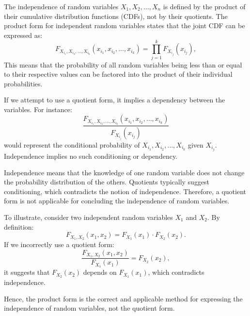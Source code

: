 \begin{solution}
    The independence of random variables \( X_1, X_2, \ldots, X_n \) is defined by the product of their cumulative distribution functions (CDFs), not by their quotients. The product form for independent random variables states that the joint CDF can be expressed as:
    \[
    F_{X_{i_1}, X_{i_2}, \ldots, X_{i_k}}(x_{i_1}, x_{i_2}, \ldots, x_{i_k}) = \prod_{j=1}^k F_{X_{i_j}}(x_{i_j}),
    \]
    This means that the probability of all random variables being less than or equal to their respective values can be factored into the product of their individual probabilities.

    If we attempt to use a quotient form, it implies a dependency between the variables. For instance:
    \[
    \frac{F_{X_{i_1}, X_{i_2}, \ldots, X_{i_k}}(x_{i_1}, x_{i_2}, \ldots, x_{i_k})}{F_{X_{i_j}}(x_{i_j})}
    \]
    would represent the conditional probability of \( X_{i_1}, X_{i_2}, \ldots, X_{i_k} \) given \( X_{i_j} \). Independence implies no such conditioning or dependency.

    Independence means that the knowledge of one random variable does not change the probability distribution of the others. Quotients typically suggest conditioning, which contradicts the notion of independence. Therefore, a quotient form is not applicable for concluding the independence of random variables.

    To illustrate, consider two independent random variables \( X_1 \) and \( X_2 \). By definition:
    \[
    F_{X_1, X_2}(x_1, x_2) = F_{X_1}(x_1) \cdot F_{X_2}(x_2).
    \]
    If we incorrectly use a quotient form:
    \[
    \frac{F_{X_1, X_2}(x_1, x_2)}{F_{X_1}(x_1)} = F_{X_2}(x_2),
    \]
    it suggests that \( F_{X_2}(x_2) \) depends on \( F_{X_1}(x_1) \), which contradicts independence.

    Hence, the product form is the correct and applicable method for expressing the independence of random variables, not the quotient form.
\end{solution}

